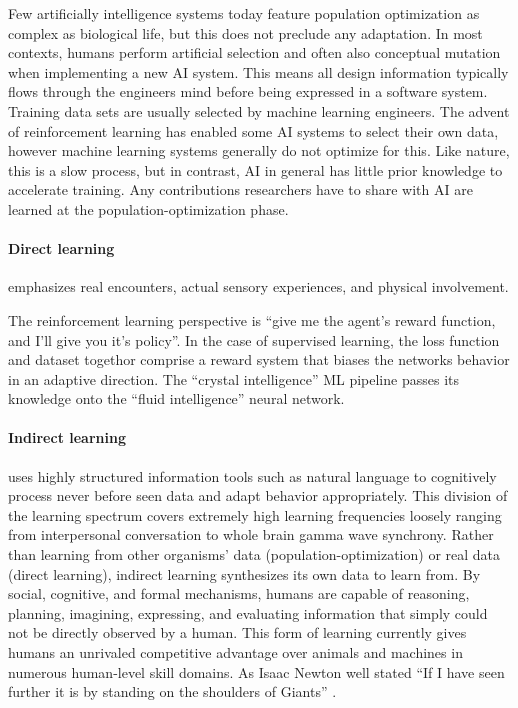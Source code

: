 Few artificially intelligence systems today feature population optimization as complex as biological life, but this does not preclude any adaptation. In most contexts, humans perform artificial selection and often also conceptual mutation when implementing a new AI system. This means all design information typically flows through the engineers mind before being expressed in a software system. Training data sets are usually selected by machine learning engineers. The advent of reinforcement learning has enabled some AI systems to select their own data, however machine learning systems generally do not optimize for this. Like nature, this is a slow process, but in contrast, AI in general has little prior knowledge to accelerate training. Any contributions researchers have to share with AI are learned at the population-optimization phase. 

\paragraph{Direct learning} emphasizes real encounters, actual sensory experiences, and physical involvement. 

The reinforcement learning perspective is ``give me the agent's reward function, and I'll give you it's policy''. In the case of supervised learning, the loss function and dataset togethor comprise a reward system that biases the networks behavior in an adaptive direction. The ``crystal intelligence'' ML pipeline passes its knowledge onto the ``fluid intelligence'' neural network.

\paragraph{Indirect learning} uses highly structured information tools such as natural language to cognitively process never before seen data and adapt behavior appropriately. This division of the learning spectrum covers extremely high learning frequencies loosely ranging from interpersonal conversation to whole brain gamma wave synchrony. Rather than learning from other organisms' data (population-optimization) or real data (direct learning), indirect learning synthesizes its own data to learn from. By social, cognitive, and formal mechanisms, humans are capable of reasoning, planning, imagining, expressing, and evaluating information that simply could not be directly observed by a human. This form of learning currently gives humans an unrivaled competitive advantage over animals and machines in numerous human-level skill domains. As Isaac Newton well stated ``If I have seen further it is by standing on the shoulders of Giants'' \cite{Chen2003}.

